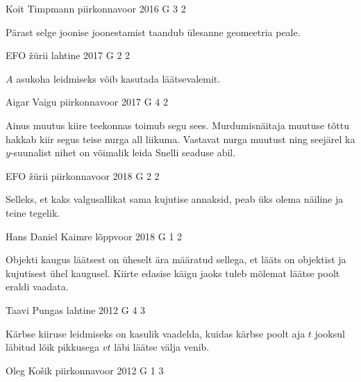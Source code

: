 \documentclass[11pt, twoside]{article}
\begin{document}
{%
{Koit Timpmann} %
{piirkonnavoor} %
{2016} %
{G 3} %
{2} %
{

\ifHint
Pärast selge joonise joonestamist taandub ülesanne geomeetria peale.
\fi
}

{EFO žürii} %
{lahtine} %
{2017} %
{G 2} %
{2} %
{

\ifHint
$A$ asukoha leidmiseks võib kasutada läätsevalemit.
\fi
}

{Aigar Vaigu} %
{piirkonnavoor} %
{2017} %
{G 4} %
{2} %
{

\ifHint
Ainus muutus kiire teekonnas toimub segu sees. Murdumisnäitaja muutuse tõttu hakkab kiir segus teise nurga all liikuma. Vastavat nurga muutust ning seejärel ka $y$-suunalist nihet on võimalik leida Snelli seaduse abil.
\fi
}

{EFO žürii} %
{piirkonnavoor} %
{2018} %
{G 2} %
{2} %
{

\ifHint
Selleks, et kaks valgusallikat sama kujutise annaksid, peab üks olema näiline ja teine tegelik.
\fi
}

{Hans Daniel Kaimre} %
{lõppvoor} %
{2018} %
{G 1} %
{2} %
{

\ifHint
Objekti kaugus läätsest on üheselt ära määratud sellega, et lääts on objektist ja kujutisest ühel kaugusel. Kiirte edasise käigu jaoks tuleb mõlemat läätse poolt eraldi vaadata.
\fi
}

{Taavi Pungas} %
{lahtine} %
{2012} %
{G 4} %
{3} %
{

\ifHint
Kärbse kiiruse leidmiseks on kasulik vaadelda, kuidas kärbse poolt aja $t$ jooksul läbitud lõik pikkusega $vt$ läbi läätse välja venib.
\fi
}

{Oleg Košik} %
{piirkonnavoor} %
{2012} %
{G 1} %
{3} %
{

}}
\end{document}
